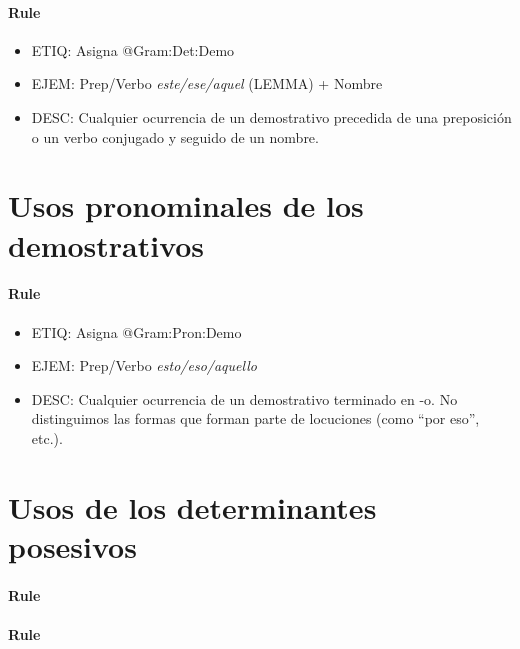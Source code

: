 \documentclass[11pt]{report}
\begin{document}
\paragraph*{Rule}
\begin{itemize}
\item ETIQ: Asigna @Gram:Det:Demo
\item EJEM: Prep/Verbo \emph{este/ese/aquel} (LEMMA) + Nombre
\item DESC: Cualquier ocurrencia de un demostrativo precedida de una preposición o un verbo conjugado y seguido de un nombre.
\end{itemize}

\section{Usos pronominales de los demostrativos}
\paragraph*{Rule}
\begin{itemize}
\item ETIQ: Asigna @Gram:Pron:Demo
\item EJEM: Prep/Verbo \emph{esto/eso/aquello}
\item DESC: Cualquier ocurrencia de un demostrativo terminado en -o. No distinguimos las formas que forman parte de locuciones (como ``por eso'', etc.).
\end{itemize}

\section{Usos de los determinantes posesivos}
\paragraph*{Rule}
\paragraph*{Rule}
\end{document}

